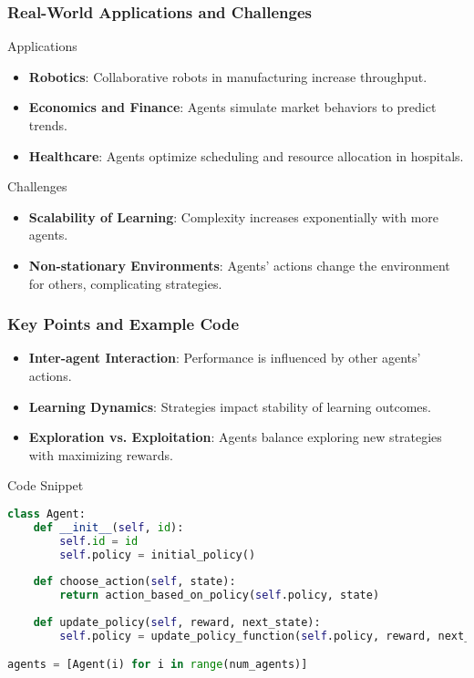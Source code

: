 \documentclass[aspectratio=169]{beamer}
\begin{document}
\begin{frame}[fragile]
    \frametitle{Real-World Applications and Challenges}
    \begin{block}{Applications}
        \begin{itemize}
            \item \textbf{Robotics}: Collaborative robots in manufacturing increase throughput.
            \item \textbf{Economics and Finance}: Agents simulate market behaviors to predict trends.
            \item \textbf{Healthcare}: Agents optimize scheduling and resource allocation in hospitals.
        \end{itemize}
    \end{block}

    \begin{block}{Challenges}
        \begin{itemize}
            \item \textbf{Scalability of Learning}: Complexity increases exponentially with more agents.
            \item \textbf{Non-stationary Environments}: Agents’ actions change the environment for others, complicating strategies.
        \end{itemize}
    \end{block}
\end{frame}

\begin{frame}[fragile]
    \frametitle{Key Points and Example Code}
    \begin{itemize}
        \item \textbf{Inter-agent Interaction}: Performance is influenced by other agents’ actions.
        \item \textbf{Learning Dynamics}: Strategies impact stability of learning outcomes.
        \item \textbf{Exploration vs. Exploitation}: Agents balance exploring new strategies with maximizing rewards.
    \end{itemize}

    \begin{block}{Code Snippet}
    \begin{lstlisting}[language=Python]
class Agent:
    def __init__(self, id):
        self.id = id
        self.policy = initial_policy()
        
    def choose_action(self, state):
        return action_based_on_policy(self.policy, state)
    
    def update_policy(self, reward, next_state):
        self.policy = update_policy_function(self.policy, reward, next_state)

agents = [Agent(i) for i in range(num_agents)]
    \end{lstlisting}
    \end{block}
\end{frame}
\end{document}
